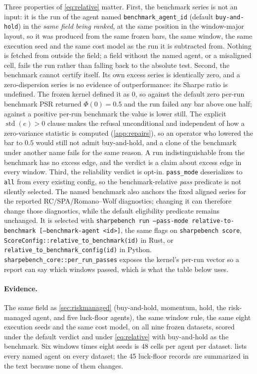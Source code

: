 Three properties of \cref{eq:relative} matter. First, the benchmark series is not an input: it is the run of the agent named \texttt{benchmark\_agent\_id} (default \texttt{buy-and-hold}) in the \emph{same field being ranked}, at the same position in the window-major layout, so it was produced from the same frozen bars, the same window, the same execution seed and the same cost model as the run it is subtracted from. Nothing is fetched from outside the field; a field without the named agent, or a misaligned cell, fails the run rather than falling back to the absolute test. Second, the benchmark cannot certify itself. Its own excess series is identically zero, and a zero-dispersion series is no evidence of outperformance: its Sharpe ratio is undefined. The frozen kernel defined it as $0$, so against the default zero per-run benchmark PSR returned $\Phi(0) = 0.5$ and the run failed any bar above one half; against a positive per-run benchmark the value is lower still. The explicit $\operatorname{std}(e) > 0$ clause makes the refusal unconditional and independent of how a zero-variance statistic is computed (\cref{app:repairs}), so an operator who lowered the bar to $0.5$ would still not admit buy-and-hold, and a clone of the benchmark under another name fails for the same reason. A run indistinguishable from the benchmark has no excess edge, and the verdict is a claim about excess edge in every window. Third, the reliability verdict is opt-in. \texttt{pass\_mode} deserializes to \texttt{all} from every existing config, so the benchmark-relative \emph{pass} predicate is not silently selected. The named benchmark also anchors the fixed aligned series for the reported RC/SPA/Romano--Wolf diagnostics; changing it can therefore change those diagnostics, while the default eligibility predicate remains unchanged. It is selected with \texttt{sharpebench run --pass-mode relative-to-benchmark [--benchmark-agent <id>]}, the same flags on \texttt{sharpebench score}, \texttt{ScoreConfig::relative\_to\_benchmark(id)} in Rust, or \texttt{relative\_to\_benchmark\_config(id)} in Python. \texttt{sharpebench\_core::per\_run\_passes} exposes the kernel's per-run vector so a report can say which windows passed, which is what the table below uses.

\paragraph{Evidence.} The same field as \cref{sec:riskmanaged} (buy-and-hold, momentum, hold, the risk-managed agent, and five luck-floor agents), the same window rule, the same eight execution seeds and the same cost model, on all nine frozen datasets, scored under the default verdict and under \cref{eq:relative} with buy-and-hold as the benchmark. Six windows times eight seeds is 48 cells per agent per dataset.  lists every named agent on every dataset; the 45 luck-floor records are summarized in the text because none of them changes.

